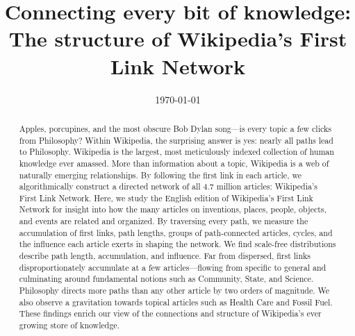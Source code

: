 \documentclass[pre,twocolumn,twoside,superscriptaddress,floatfix]{revtex4-1}
\begin{document}
\title{\protect
Connecting every bit of knowledge: \\
The structure of Wikipedia's First Link Network
}

\author{
}


\author{
}


\author{
}



\date{\today}

\begin{abstract}
  \protect
  Apples, porcupines, and the most obscure Bob Dylan song---is every topic a few clicks from Philosophy? 
Within Wikipedia, the surprising answer is yes: nearly all 
paths lead to Philosophy.
Wikipedia is the largest, most meticulously indexed collection of human knowledge ever amassed. 
More than information about a topic, Wikipedia is a web of naturally emerging relationships.  
By following the first link in each article, we algorithmically construct a directed network of 
all 4.7 million articles: Wikipedia's First Link Network.
Here, we study the English edition of Wikipedia's First Link Network for insight into how the many 
articles on inventions, places, people, objects, and events are related and organized.  
By traversing every path, we measure the accumulation of first links, path lengths,
groups of path-connected articles, cycles,
and the influence each article exerts in shaping the network.
We find scale-free distributions describe path length, 
accumulation, and influence. Far from dispersed, first links disproportionately accumulate 
at a few articles---flowing from specific to general and culminating around fundamental notions such as
Community, State, and Science. 
Philosophy directs more paths than any other article by two orders of magnitude. 
We also observe a gravitation towards topical articles such as 
Health Care and Fossil Fuel. 
These findings enrich our view of the connections and structure of
Wikipedia's ever growing store of knowledge.

 
\end{abstract}
\end{document}

